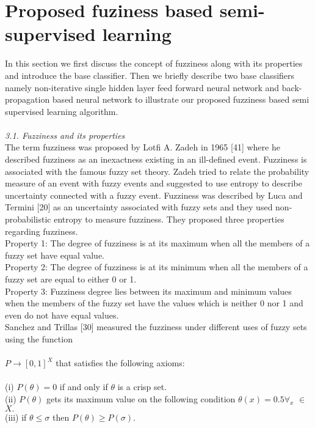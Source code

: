 \documentclass{article}
\begin{document}
		\section{Proposed fuziness based semi-supervised learning}
		
		In this section we first discuss the concept of fuzziness along with its properties and introduce the base
		classifier. Then we briefly describe two base classifiers namely non-iterative single hidden layer feed forward
		neural network and back-propagation based neural network to illustrate our proposed fuzziness based semi supervised learning algorithm.\\\\
		
		\textit{3.1. Fuzziness and its properties}\\
		
		The term fuzziness was proposed by Lotfi A. Zadeh in 1965 [41] \cite{dombi1982general} where he described fuzziness as an
		inexactness existing in an ill-defined event. Fuzziness is associated with the famous fuzzy set theory. Zadeh
		tried to relate the probability measure of an event with fuzzy events and suggested to use entropy to describe
		uncertainty connected with a fuzzy event. Fuzziness was described by Luca and Termini [20] \cite{ghosh1993self} as an uncertainty
		associated with fuzzy sets and they used non-probabilistic entropy to measure fuzziness. They proposed three
		properties regarding fuzziness.\\
		
		Property 1: The degree of fuzziness is at its maximum when all the members of a fuzzy set have equal
		value.\\
		Property 2: The degree of fuzziness is at its minimum when all the members of a fuzzy set are equal to
		either 0 or 1.\\
		Property 3: Fuzziness degree lies between its maximum and minimum values when the members of the
		fuzzy set have the values which is neither 0 nor 1 and even do not have equal values.\\
		
		Sanchez and Trillas [30] measured the fuzziness under different uses of fuzzy sets using the function\\\\
		$P \rightarrow [0, 1]^X$ that satisfies the following axioms:\\\\
		(i) $P{(\theta)} = 0$ if and only if $\theta$ is a crisp set.\\
		(ii) $P{(\theta)}$ gets its maximum value on the following condition ${\theta(x)} = 0.5\forall_x$ $\in$ $X.$\\
		(iii) if $\theta \le \sigma$ then $P(\theta) \ge P(\sigma).$
		
\end{document}
